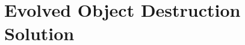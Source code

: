 \chapter{Evolved Object Destruction Solution}
\label{app:DestructionSolution}

\singlespacing

\begin{multicols}{2}

\tiny


\end{multicols}

\doublespacing
